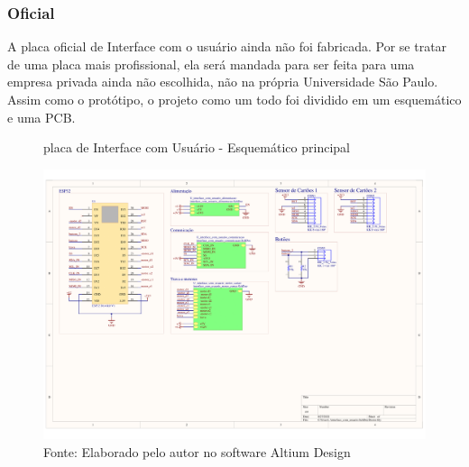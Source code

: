 \documentclass[../poliXuniversity_hospital_-USP-report.tex]{subfiles}
\begin{document}

\clearpage
\subsubsection{Oficial}

A placa oficial de Interface com o usuário ainda não foi fabricada. Por se tratar de uma placa mais profissional, ela será mandada para ser feita para uma empresa privada ainda não escolhida, não na própria Universidade São Paulo. Assim como o protótipo, o projeto como um todo foi dividido em um esquemático e uma PCB.

\begin{figure}[!ht]
\centering
    \caption{placa de Interface com Usuário - Esquemático principal }
    \centering %
    \includegraphics[width=17cm]{modulos/interface_com_usuario-1.png}
    \caption*{Fonte: Elaborado pelo autor no software Altium Design\cite{altium21} }
    \label{Protótipo placa de ## - Esquemático principal}
\end{figure}
\end{document}
